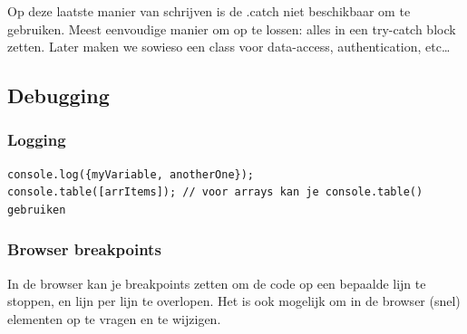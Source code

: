 \documentclass{article}
\begin{document}
Op deze laatste manier van schrijven is de .catch niet beschikbaar om te gebruiken.
Meest eenvoudige manier om op te lossen: alles in een try-catch block zetten.
Later maken we sowieso een class voor data-access, authentication, etc\dots


\subsection{Debugging}

\subsubsection{Logging}
\begin{lstlisting}
console.log({myVariable, anotherOne});
console.table([arrItems]); // voor arrays kan je console.table() gebruiken
\end{lstlisting}

\subsubsection{Browser breakpoints}

In de browser kan je breakpoints zetten om de code op een bepaalde lijn te stoppen, en lijn per lijn te overlopen.
Het is ook mogelijk om in de browser (snel) elementen op te vragen en te wijzigen.
\end{document}
